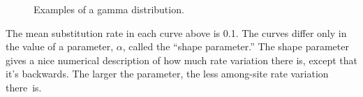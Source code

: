 \documentclass[12pt]{article}
\begin{document}
\begin{figure}
\begin{center}
\end{center}
\caption{Examples of a gamma distribution.}\label{fig:asrv}
\end{figure}

The mean substitution rate in each curve above is 0.1. The curves
differ only in the value of a parameter, $\alpha$, called the ``shape
parameter.'' The shape parameter gives a nice numerical description of
how much rate variation there is, except that it's backwards. The
larger the parameter, the less among-site rate variation
there~is.




\ccLicense
\end{document}
